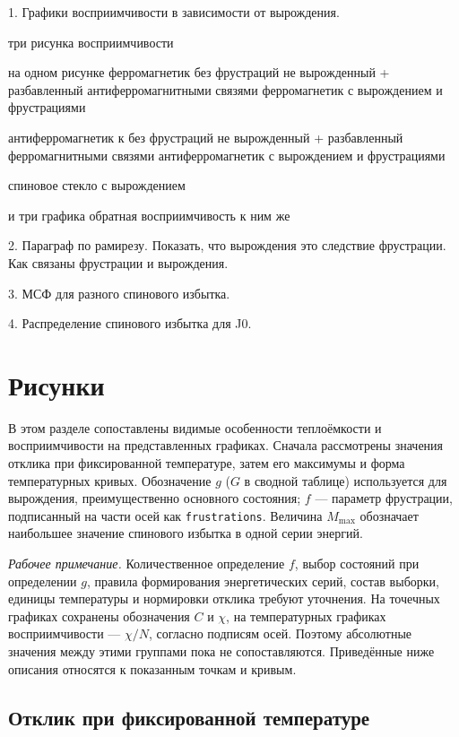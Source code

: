 \documentclass[utf8, babel, sor, jor, amsmath, amssymb, reprint]{elsarticle} %
\begin{document}
1. Графики восприимчивости в зависимости от вырождения.

три рисунка восприимчивости

на одном рисунке ферромагнетик без фрустраций не вырожденный + разбавленный антиферромагнитными связями ферромагнетик с вырождением и фрустрациями

антиферромагнетик к без фрустраций не вырожденный + разбавленный ферромагнитными связями антиферромагнетик с вырождением и фрустрациями

спиновое стекло с вырождением

и три графика обратная восприимчивость к ним же

2. Параграф по рамирезу. Показать, что вырождения это следствие фрустрации. Как связаны фрустрации и вырождения.

3. МСФ для разного спинового избытка.

4. Распределение спинового избытка для J0.


\section{Рисунки}

В этом разделе сопоставлены видимые особенности теплоёмкости и восприимчивости на представленных графиках. Сначала рассмотрены значения отклика при фиксированной температуре, затем его максимумы и форма температурных кривых. Обозначение $g$ ($G$ в сводной таблице) используется для вырождения, преимущественно основного состояния; $f$ --- параметр фрустрации, подписанный на части осей как \texttt{frustrations}. Величина $M_{\max}$ обозначает наибольшее значение спинового избытка в одной серии энергий.

\textit{Рабочее примечание.} Количественное определение $f$, выбор состояний при определении $g$, правила формирования энергетических серий, состав выборки, единицы температуры и нормировки отклика требуют уточнения. На точечных графиках сохранены обозначения $C$ и $\chi$, на температурных графиках восприимчивости --- $\chi/N$, согласно подписям осей. Поэтому абсолютные значения между этими группами пока не сопоставляются. Приведённые ниже описания относятся к показанным точкам и кривым.

\subsection{Отклик при фиксированной температуре}
\end{document}
